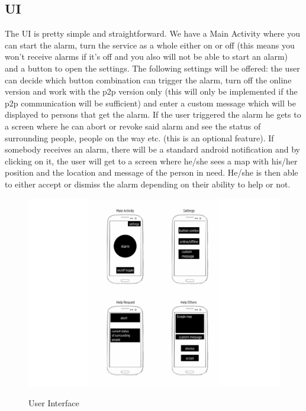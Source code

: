 \documentclass{report}
\newcommand{\lfig}[1]{\label{fig:#1}}
\begin{document}
\subsection{UI}

The UI is pretty simple and straightforward. We have a Main Activity where you can start the alarm, turn the service as a whole either on or off (this means you won't receive alarms if it's off and you also will not be able to start an alarm) and a button to open the settings. The following  settings will be offered: the user can decide which button combination can trigger the alarm, turn off the online version and work with the p2p version only (this will only be implemented if the p2p communication will be sufficient) and enter a custom message which will be displayed to persons that get the alarm. If the user triggered the alarm he gets to a screen where he can abort or revoke said alarm and see the status of surrounding people, people on the way etc. (this is an optional feature). If somebody receives an alarm, there will be a standard android notification and by clicking on it, the user will get to a screen where he/she sees a map with his/her position and the location and message of the person in need. He/she is then able to either accept or dismiss the alarm depending on their ability to help or not.

\begin{figure}[h]
	\centering
    \includegraphics[width=\columnwidth]{Notruf.pdf}
    \lfig{app-ui}
    \vspace{-5mm} %
	\caption{User Interface}
\end{figure}
\end{document}
